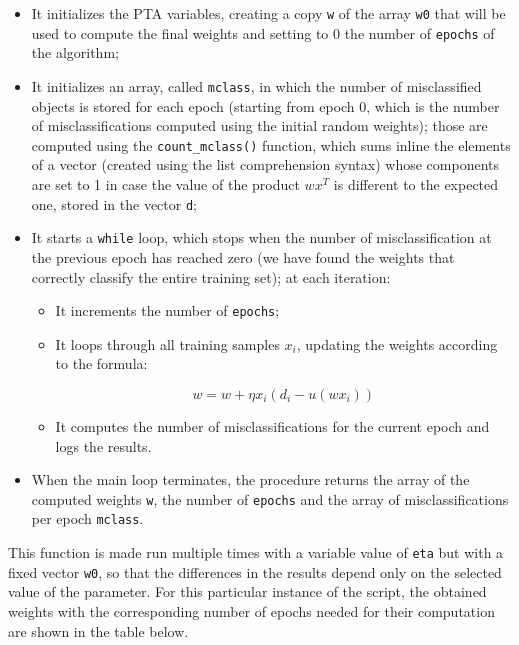 \documentclass[letterpaper,headings=standardclasses]{scrartcl}
\begin{document}
\begin{itemize}

\item It initializes the PTA variables, creating a copy \texttt{w} of the array \texttt{w0} that will be used to compute the final weights and setting to 0 the number of \texttt{epochs} of the algorithm;

\item It initializes an array, called \texttt{mclass}, in which the number of misclassified objects is stored for each epoch (starting from epoch 0, which is the number of misclassifications computed using the initial random weights); those are computed using the \texttt{count\_mclass()} function, which sums inline the elements of a vector (created using the list comprehension syntax) whose components are set to 1 in case the value of the product $wx^T$ is different to the expected one, stored in the vector \texttt{d};

\item It starts a \texttt{while} loop, which stops when the number of misclassification at the previous epoch has reached zero (we have found the weights that correctly classify the entire training set); at each iteration:

\begin{itemize}

\item It increments the number of \texttt{epochs};

\item It loops through all training samples $x_i$, updating the weights according to the formula:

$$ w = w + \eta x_i (d_i - u(w x_i)) $$

\item It computes the number of misclassifications for the current epoch and logs the results.

\end{itemize}

\item When the main loop terminates, the procedure returns the array of the computed weights \texttt{w}, the number of \texttt{epochs} and the array of misclassifications per epoch \texttt{mclass}.

\end{itemize}

This function is made run multiple times with a variable value of \texttt{eta} but with a fixed vector \texttt{w0}, so that the differences in the results depend only on the selected value of the parameter. For this particular instance of the script, the obtained weights with the corresponding number of epochs needed for their computation are shown in the table below.
\end{document}

